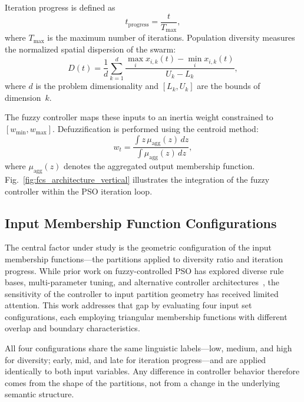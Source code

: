 \documentclass[conference]{IEEEtran}
\begin{document}
Iteration progress is defined as
\begin{equation}
    t_{\text{progress}} = \frac{t}{T_{\max}},
    \label{eq:iteration_progress}
\end{equation}
where $T_{\max}$ is the maximum number of iterations. Population diversity measures the normalized spatial dispersion of the swarm:
\begin{equation}
    D(t) = \frac{1}{d} \sum_{k=1}^{d}
    \frac{\max_i x_{i,k}(t) - \min_i x_{i,k}(t)}{U_k - L_k},
    \label{eq:diversity_metric}
\end{equation}
where $d$ is the problem dimensionality and $[L_k, U_k]$ are the bounds of dimension~$k$.

The fuzzy controller maps these inputs to an inertia weight constrained to $[w_{\min}, w_{\max}]$. Defuzzification is performed using the centroid method:
\begin{equation}
    w_t = \frac{\int z \, \mu_{\text{agg}}(z)\, dz}{\int \mu_{\text{agg}}(z)\, dz},
    \label{eq:defuzzification}
\end{equation}
where $\mu_{\text{agg}}(z)$ denotes the aggregated output membership function. Fig.~\ref{fig:fcs_architecture_vertical} illustrates the integration of the fuzzy controller within the PSO iteration loop.




\subsection{Input Membership Function Configurations}
\label{subsec:input_mf_configs}

The central factor under study is the geometric configuration of the input membership functions---the partitions applied to diversity ratio and iteration progress. While prior work on fuzzy-controlled PSO has explored diverse rule bases, multi-parameter tuning, and alternative controller architectures~\cite{shi2001fuzzy, nobile2018fuzzy, xia2022particle}, the sensitivity of the controller to input partition geometry has received limited attention. This work addresses that gap by evaluating four input set configurations, each employing triangular membership functions with different overlap and boundary characteristics.

All four configurations share the same linguistic labels---low, medium, and high for diversity; early, mid, and late for iteration progress---and are applied identically to both input variables. Any difference in controller behavior therefore comes from the shape of the partitions, not from a change in the underlying semantic structure.
\end{document}
